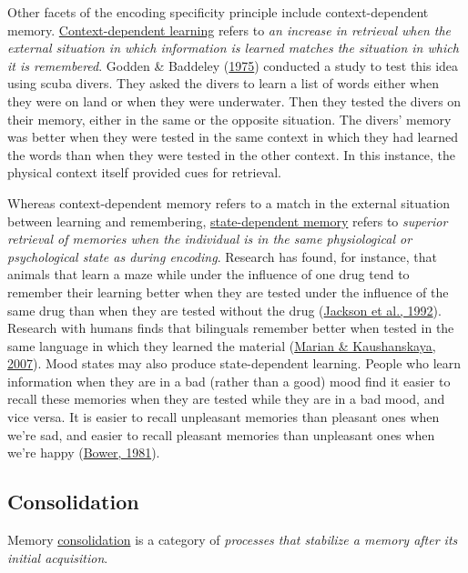 \documentclass[
]{krantz}
\begin{document}
Other facets of the encoding specificity principle include context-dependent memory. \protect\hyperlink{context-dependent-learning}{Context-dependent learning} refers to \emph{an increase in retrieval when the external situation in which information is learned matches the situation in which it is remembered}. Godden \& Baddeley (\protect\hyperlink{ref-Godden1975}{1975}) conducted a study to test this idea using scuba divers. They asked the divers to learn a list of words either when they were on land or when they were underwater. Then they tested the divers on their memory, either in the same or the opposite situation. The divers' memory was better when they were tested in the same context in which they had learned the words than when they were tested in the other context. In this instance, the physical context itself provided cues for retrieval.

Whereas context-dependent memory refers to a match in the external situation between learning and remembering, \protect\hyperlink{state-dependent-memory}{state-dependent memory} refers to \emph{superior retrieval of memories when the individual is in the same physiological or psychological state as during encoding}. Research has found, for instance, that animals that learn a maze while under the influence of one drug tend to remember their learning better when they are tested under the influence of the same drug than when they are tested without the drug (\protect\hyperlink{ref-Jackson1992}{Jackson et al., 1992}). Research with humans finds that bilinguals remember better when tested in the same language in which they learned the material (\protect\hyperlink{ref-Marian2007}{Marian \& Kaushanskaya, 2007}). Mood states may also produce state-dependent learning. People who learn information when they are in a bad (rather than a good) mood find it easier to recall these memories when they are tested while they are in a bad mood, and vice versa. It is easier to recall unpleasant memories than pleasant ones when we're sad, and easier to recall pleasant memories than unpleasant ones when we're happy (\protect\hyperlink{ref-Bower1981}{Bower, 1981}).

\hypertarget{consolidation}{%
\subsection*{Consolidation}\label{consolidation}}


Memory \protect\hyperlink{consolidation}{consolidation} is a category of \emph{processes that stabilize a memory after its initial acquisition}.
\end{document}
